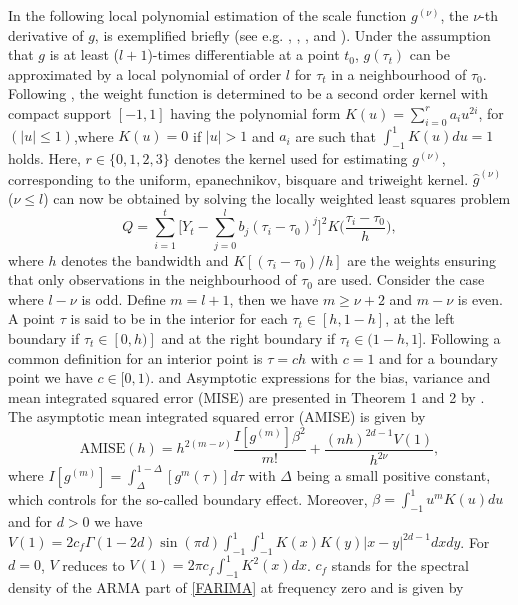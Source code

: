 \documentclass[12pt]{article}
\begin{document}
In the following local polynomial estimation of the scale function $g^{(\nu)}$, the $\nu$-th derivative of $g$, is exemplified briefly (see e.g. \cite{beran2002iterative}, \cite{beran2002local}, \cite{beran2002semifar}, and \cite{beran2013limit}). Under the assumption that $g$ is at least ($l+1$)-times differentiable at a point $t_0$, $g(\tau_t)$ can be approximated by a local polynomial of order $l$ for $\tau_t$ in a neighbourhood of $\tau_0$. Following \citet{gasser1979kernel}, the weight function is determined to be a second order kernel with compact support $[-1,1]$ having the polynomial form $K(u)=\sum_{i=0}^{r}a_i u^{2i}$, for $(|u|\leq1)$,where $K(u)=0$ if $|u|>1$ and $a_i$ are such that $\int_{-1}^{1}K(u)du=1$ holds.  Here, $r \in \{0,1,2,3\}$ denotes the kernel used for estimating $g^{(\nu)}$, corresponding to the uniform, epanechnikov, bisquare and triweight kernel.
$\hat{g}^{(\nu)}$ ($\nu\leq l$) can now be obtained by solving the locally weighted least squares problem
\begin{equation}
\label{LP}
Q=\sum_{i=1}^{t}\Bigg[Y_t-\sum_{j=0}^{l}b_j(\tau_i-\tau_0)^j\Bigg]^2 K\Big(\frac{\tau_i-\tau_0}{h}\Big),	
\end{equation}
where $h$ denotes the bandwidth and $K[(\tau_i-\tau_0)/h]$ are the weights ensuring that only observations in the neighbourhood of $\tau_0$ are used. Consider the case where $l-\nu$ is odd. Define $m=l+1$, then we have $m \geq \nu + 2$ and $m-\nu$ is even. A point $\tau$ is said to be in the interior for each $\tau_t\in [h,1-h]$, at the left boundary if $\tau_t\in [0,h)]$ and at the right boundary if $\tau_t\in (1-h,1]$. Following \citet{beran2002local} a common definition for an interior point is $\tau=ch$ with $c=1$ and for a boundary point we have $c \in [0,1)$.   
\citet{beran2002iterative} and \citet{beran2002local}  Asymptotic expressions for the bias, variance and mean integrated squared error (MISE) are presented in Theorem 1 and 2 by \citet{beran2002local}. The asymptotic mean integrated squared error (AMISE) is given by
\begin{equation}
	\label{AMISE}
	\text{AMISE}(h) = h^{2(m-\nu)} \frac{I[g^{(m)}]\beta^2}{m!} + \frac{(nh)^{2d-1}V(1)}{h^{2\nu}},
\end{equation}
where $I[g^{(m)}] = \int_{\Delta}^{1-\Delta}[g^{m}(\tau)]d\tau$ with $\Delta$ being a small positive constant, which controls for the so-called boundary effect. Moreover, $\beta = \int_{-1}^{1}u^mK(u)du$ and for $d > 0 $ we have $V(1)=2c_f \Gamma(1-2d)\sin (\pi d) \int_{-1}^{1} \int_{-1}^{1} K(x)K(y)|x-y|^{2d-1}dxdy$. For $d = 0$, $V$ reduces to $V(1)=2\pi c_f \int_{-1}^{1}K^2(x)dx$. $c_f$ stands for the spectral density of the ARMA part of \eqref{FARIMA} at frequency zero and is given by 
\end{document}
